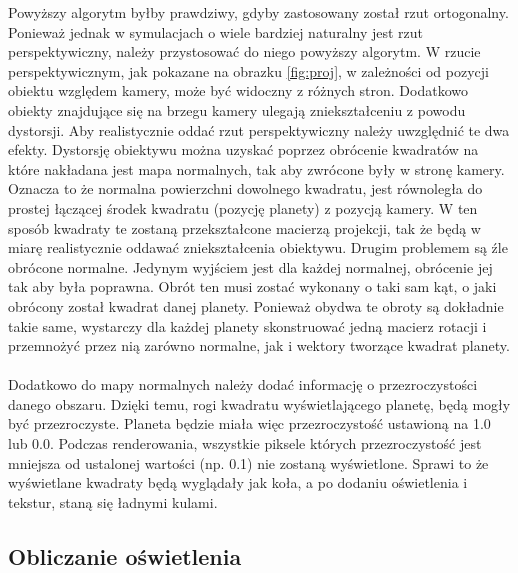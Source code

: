 Powyższy algorytm byłby prawdziwy, gdyby zastosowany został rzut ortogonalny. Ponieważ jednak w symulacjach o wiele bardziej naturalny jest rzut perspektywiczny, należy przystosować do niego powyższy algorytm. W rzucie perspektywicznym, jak pokazane na obrazku \hyperref[fig:proj]{\ref*{fig:proj}}, w zależności od pozycji obiektu względem kamery, może być widoczny z różnych stron. Dodatkowo obiekty znajdujące się na brzegu kamery ulegają zniekształceniu z powodu dystorsji. Aby realistycznie oddać rzut perspektywiczny należy uwzględnić te dwa efekty. Dystorsję obiektywu można uzyskać poprzez obrócenie kwadratów na które nakładana jest mapa normalnych, tak aby zwrócone były w stronę kamery. Oznacza to że normalna powierzchni dowolnego kwadratu, jest równoległa do prostej łączącej środek kwadratu (pozycję planety) z pozycją kamery. W ten sposób kwadraty te zostaną przekształcone macierzą projekcji, tak że będą w miarę realistycznie oddawać zniekształcenia obiektywu. Drugim problemem są źle obrócone normalne. Jedynym wyjściem jest dla każdej normalnej, obrócenie jej tak aby była poprawna. Obrót ten musi zostać wykonany o taki sam kąt, o jaki obrócony został kwadrat danej planety. Ponieważ obydwa te obroty są dokładnie takie same, wystarczy dla każdej planety skonstruować jedną macierz rotacji i przemnożyć przez nią zarówno normalne, jak i wektory tworzące kwadrat planety.


\paragraph{}

Dodatkowo do mapy normalnych należy dodać informację o przezroczystości danego obszaru. Dzięki temu, rogi kwadratu wyświetlającego planetę, będą mogły być przezroczyste. Planeta będzie miała więc przezroczystość ustawioną na 1.0 lub 0.0. Podczas renderowania, wszystkie piksele których przezroczystość jest mniejsza od ustalonej wartości (np. 0.1) nie zostaną wyświetlone. Sprawi to że wyświetlane kwadraty będą wyglądały jak koła, a po dodaniu oświetlenia i tekstur, staną się ładnymi kulami.

\subsection{Obliczanie oświetlenia}\label{sub:obliczanie oświetlenia}
\paragraph{}

